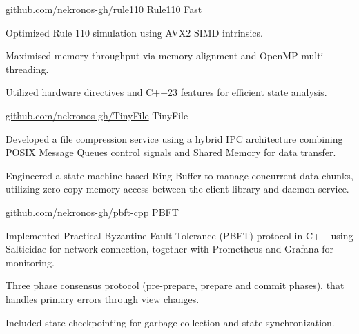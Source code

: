 
\begin{cventries}

  \cventry
    {\href{https://github.com/nekronos-gh/rule110}{github.com/nekronos-gh/rule110}}
    {Rule110 Fast}
    {}
    {}
    {
      \begin{cvitems}
        \item {Optimized Rule 110 simulation using AVX2 SIMD intrinsics.} 
        \item {Maximised memory throughput via memory alignment and OpenMP multi-threading.}
        \item {Utilized hardware directives and C++23 features for efficient state analysis.}
      \end{cvitems}
    }


  \cventry
    {\href{https://github.com/nekronos-gh/TinyFile}{github.com/nekronos-gh/TinyFile}}
    {TinyFile}
    {}
    {}
    {
      \begin{cvitems}
        \item {Developed a file compression service using a hybrid IPC architecture combining POSIX Message Queues control signals and Shared Memory for data transfer.}
        \item {Engineered a state-machine based Ring Buffer to manage concurrent data chunks, utilizing zero-copy memory access between the client library and daemon service.}
      \end{cvitems}
    }


  \cventry
    {\href{https://github.com/nekronos-gh/pbft-cpp}{github.com/nekronos-gh/pbft-cpp}}
    {PBFT}
    {}
    {}
    {
      \begin{cvitems}
        \item {Implemented Practical Byzantine Fault Tolerance (PBFT) protocol in C++ using Salticidae for network connection, together with Prometheus and Grafana for monitoring.}
        \item {Three phase consensus protocol (pre-prepare, prepare and commit phases), that handles primary errors through view changes.}
        \item {Included state checkpointing for garbage collection and state synchronization.}
      \end{cvitems}
    }

\end{cventries}
